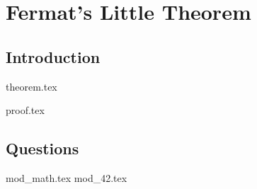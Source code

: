 \documentclass{exam}
\begin{document}
\section{Fermat's Little Theorem}
\subsection{Introduction}
{theorem.tex}
\begin{questions}
{proof.tex}
\end{questions}
\subsection{Questions}
\begin{questions}
{mod_math.tex}
{mod_42.tex}
\end{questions}




\end{document}
